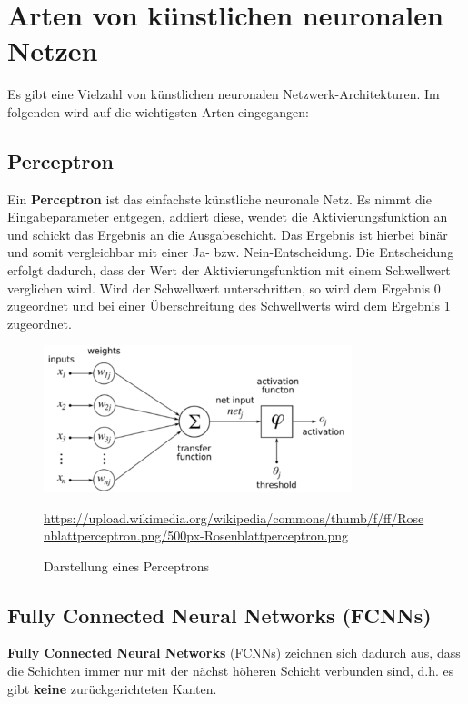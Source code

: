 \section{Arten von  künstlichen neuronalen Netzen}

Es gibt eine Vielzahl von künstlichen neuronalen Netzwerk-Architekturen. Im folgenden wird auf die wichtigsten Arten eingegangen:

\subsection{Perceptron}

	Ein \textbf{Perceptron} ist das einfachste künstliche neuronale Netz. Es nimmt die Eingabeparameter entgegen, addiert diese, wendet die Aktivierungsfunktion an und schickt das Ergebnis an die Ausgabeschicht. Das Ergebnis ist hierbei binär und somit vergleichbar mit einer Ja- bzw. Nein-Entscheidung. Die Entscheidung erfolgt dadurch, dass der Wert der Aktivierungsfunktion mit einem Schwellwert verglichen wird. Wird der Schwellwert unterschritten, so wird dem Ergebnis 0 zugeordnet und bei einer Überschreitung des Schwellwerts wird dem Ergebnis 1 zugeordnet.
	
	\begin{figure}[H]
		\centering
		\includegraphics[width=0.8\textwidth]{kapitel3/images/perceptron.png}
		\caption{Darstellung eines Perceptrons}
		\vspace{0.2cm}
		\quelle\url{https://upload.wikimedia.org/wikipedia/commons/thumb/f/ff/Rosenblattperceptron.png/500px-Rosenblattperceptron.png}
		\end{figure}

\subsection{Fully Connected Neural Networks (FCNNs)}

	\textbf{Fully Connected Neural Networks} (FCNNs) zeichnen sich dadurch aus, dass die Schichten immer nur mit der nächst höheren Schicht verbunden sind, d.h. es gibt \textbf{keine} zurückgerichteten Kanten. \cite{datasolut4}
	
